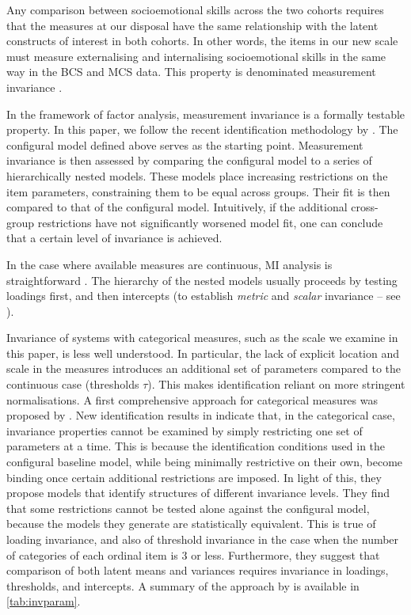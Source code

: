 Any comparison between socioemotional skills across the two cohorts requires that the measures at our disposal have the same relationship with the latent constructs of interest in both cohorts. In other words, the items in our new scale must measure externalising and internalising socioemotional skills in the same way in the BCS and MCS data. This property is denominated measurement invariance \citep{Vandenberg2000a,Putnick2016}.

In the framework of factor analysis, measurement invariance is a formally testable property. In this paper, we follow the recent identification methodology by \citet{Wu2016a}. The configural model defined above serves as the starting point. Measurement invariance is then assessed by comparing the configural model to a series of hierarchically nested models. These models place increasing restrictions on the item parameters, constraining them to be equal across groups. Their fit is then compared to that of the configural model. Intuitively, if the additional cross-group restrictions have not significantly worsened model fit, one can conclude that a certain level of invariance is achieved. 

In the case where available measures are continuous, MI analysis is straightforward \citep{vandeSchoot2012}. The hierarchy of the nested models usually proceeds by testing loadings first, and then intercepts (to establish \emph{metric} and \emph{scalar} invariance -- see \citealp{Vandenberg2000a}).

Invariance of systems with categorical measures, such as the scale we examine in this paper, is less well understood. In particular, the lack of explicit location and scale in the measures introduces an additional set of parameters compared to the continuous case (thresholds $\tau$). This makes identification reliant on more stringent normalisations. A first comprehensive approach for categorical measures was proposed by \cite{Millsap2004}. New identification results in \cite{Wu2016a} indicate that, in the categorical case, invariance properties cannot be examined by simply restricting one set of parameters at a time. This is because the identification conditions used in the configural baseline model, while being minimally restrictive on their own, become binding once certain additional restrictions are imposed. In light of this, they propose models that identify structures of different invariance levels. They find that some restrictions cannot be tested alone against the configural model, because the models they generate are statistically equivalent. This is true of loading invariance, and also of threshold invariance in the case when the number of categories of each ordinal item is 3 or less. Furthermore, they suggest that comparison of both latent means and variances requires invariance in loadings, thresholds, and intercepts. A summary of the approach by \cite{Wu2016a} is available in \autoref{tab:invparam}.

